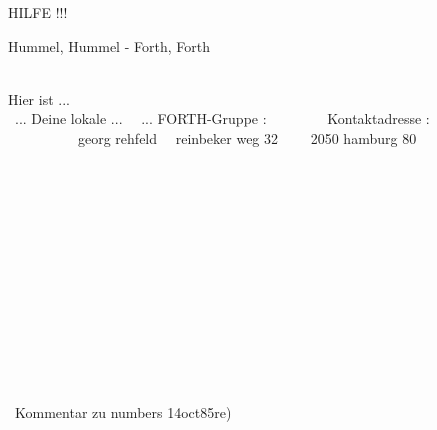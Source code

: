                                          
                                         
                                         
  HILFE !!!                              
                                         
                                         
                                         
                                         
                                         
                                         
                                         
                                         
                                         
                                         
       Hummel, Hummel - Forth, Forth     
                                         
                                         
                                         
                                         
                                         
                                         
                                         
                                         
                                        
\\ Hier ist  ...                      \\ 
\      ... Deine lokale ...            \ 
\           ... FORTH-Gruppe :         \ 
\                                      \ 
\                                      \ 
\                                      \ 
\           Kontaktadresse :           \ 
\                                      \ 
\                                      \ 
\                                      \ 
\                                      \ 
\           georg    rehfeld           \ 
\           reinbeker weg 32           \ 
\                                      \ 
\           2050  hamburg 80           \ 
\                                      \ 
\                                      \ 
\                                      \ 
\                                      \ 
\                                      \ 
\                                      \ 
\                                      \ 
\                                      \ 
\                                      \ 
\\ \\ \\ \\ \\ \\  \\  \\ \\ \\ \\ \\ \\
\ Kommentar zu numbers        14oct85re) 
                                         
